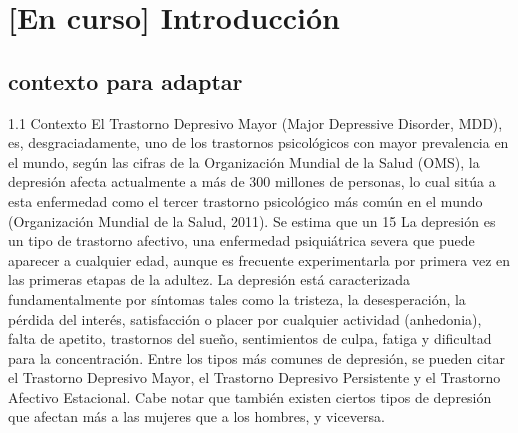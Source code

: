 \chapter{[En curso] Introducción}
\label{chapter:introduccion}


\section{contexto para adaptar}

1.1 Contexto
El Trastorno Depresivo Mayor (Major Depressive Disorder, MDD), es, desgraciadamente, uno de los trastornos psicológicos con mayor prevalencia en el mundo, según las cifras de la Organización Mundial de la Salud (OMS), la depresión afecta actualmente a más de 300 millones de personas, lo cual sitúa a esta enfermedad como el tercer trastorno psicológico más común en el mundo (Organización Mundial de la Salud, 2011).
Se estima que un 15%
La depresión es un tipo de trastorno afectivo, una enfermedad psiquiátrica severa que puede aparecer a cualquier edad, aunque es frecuente experimentarla por primera vez en las primeras etapas de la adultez. La depresión está caracterizada fundamentalmente por síntomas tales como la tristeza, la desesperación, la pérdida del interés, satisfacción o placer por cualquier actividad (anhedonia), falta de apetito, trastornos del sueño, sentimientos de culpa, fatiga y dificultad para la concentración.
Entre los tipos más comunes de depresión, se pueden citar el Trastorno Depresivo Mayor, el Trastorno Depresivo Persistente y el Trastorno Afectivo Estacional. Cabe notar que también existen ciertos tipos de depresión que afectan más a las mujeres que a los hombres, y viceversa.
